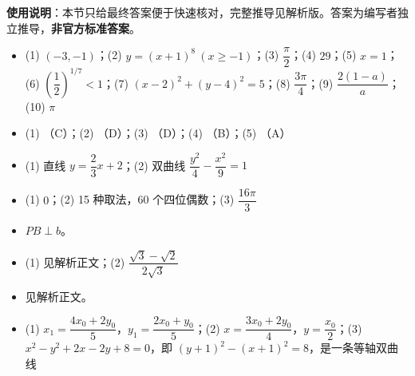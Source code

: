 
\begin{gknotice}
\textbf{使用说明}：本节只给最终答案便于快速核对，完整推导见解析版。答案为编写者独立推导，\textbf{非官方标准答案}。
\end{gknotice}

\begin{itemize}[leftmargin=2.6em]
  \item[\textbf{1.}] (1) $(-3,-1)$；(2) $y=(x+1)^8\ (x\ge-1)$；(3) $\dfrac\pi2$；(4) $29$；(5) $x=1$；(6) $\left(\dfrac12\right)^{1/7}<1$；(7) $(x-2)^2+(y-4)^2=5$；(8) $\dfrac{3\pi}{4}$；(9) $\dfrac{2(1-a)}a$；(10) $\pi$
  \item[\textbf{2.}] (1) （C）；(2) （D）；(3) （D）；(4) （B）；(5) （A）
  \item[\textbf{3.}] (1) 直线 $y=\dfrac23x+2$；(2) 双曲线 $\dfrac{y^2}{4}-\dfrac{x^2}{9}=1$
  \item[\textbf{4.}] (1) $0$；(2) 15 种取法，60 个四位偶数；(3) $\dfrac{16\pi}{3}$
  \item[\textbf{5.}] $PB\perp b$。
  \item[\textbf{6.}] (1) 见解析正文；(2) $\dfrac{\sqrt3-\sqrt2}{2\sqrt3}$
  \item[\textbf{7.}] 见解析正文。
  \item[\textbf{8.}] (1) $x_1=\dfrac{4x_0+2y_0}{5}$，$y_1=\dfrac{2x_0+y_0}{5}$；(2) $x=\dfrac{3x_0+2y_0}{4}$，$y=\dfrac{x_0}{2}$；(3) $x^2-y^2+2x-2y+8=0$，即 $(y+1)^2-(x+1)^2=8$，是一条等轴双曲线
\end{itemize}
